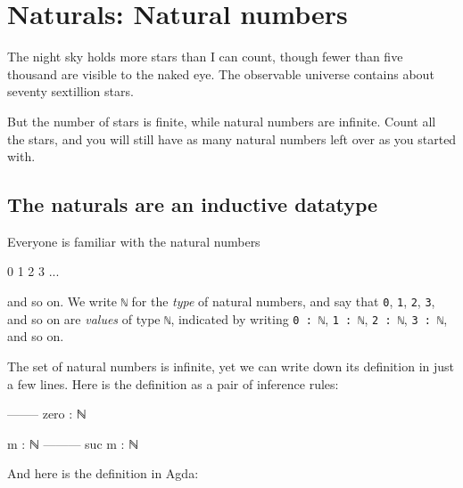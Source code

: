 \hypertarget{Naturals}{%
\chapter{Naturals: Natural numbers}\label{Naturals}}

\begin{fence}
\begin{code}%
\>[0]\AgdaSpace{}%
\AgdaSpace{}%
\<%
\end{code}
\end{fence}

The night sky holds more stars than I can count, though fewer than five
thousand are visible to the naked eye. The observable universe contains
about seventy sextillion stars.

But the number of stars is finite, while natural numbers are infinite.
Count all the stars, and you will still have as many natural numbers
left over as you started with.

\hypertarget{the-naturals-are-an-inductive-datatype}{%
\section{The naturals are an inductive
datatype}\label{the-naturals-are-an-inductive-datatype}}

Everyone is familiar with the natural numbers

\begin{myDisplay}
0
1
2
3
...
\end{myDisplay}

and so on. We write \texttt{ℕ} for the \emph{type} of natural numbers,
and say that \texttt{0}, \texttt{1}, \texttt{2}, \texttt{3}, and so on
are \emph{values} of type \texttt{ℕ}, indicated by writing
\texttt{0\ :\ ℕ}, \texttt{1\ :\ ℕ}, \texttt{2\ :\ ℕ}, \texttt{3\ :\ ℕ},
and so on.

The set of natural numbers is infinite, yet we can write down its
definition in just a few lines. Here is the definition as a pair of
inference rules:

\begin{myDisplay}
--------
zero : ℕ

m : ℕ
---------
suc m : ℕ
\end{myDisplay}

And here is the definition in Agda:

\begin{fence}
\begin{code}%
\>[0]\AgdaSpace{}%
\AgdaSpace{}%
\AgdaSymbol{:}\AgdaSpace{}%
\AgdaSpace{}%
\<%
\\
\>[0][@{}l@{\AgdaIndent{0}}]%
\>[2]\AgdaSpace{}%
\AgdaSymbol{:}\AgdaSpace{}%
\<%
\\
%
\>[2]%
\>[7]\AgdaSymbol{:}\AgdaSpace{}%
\AgdaSpace{}%
\AgdaSpace{}%
\<%
\end{code}
\end{fence}

